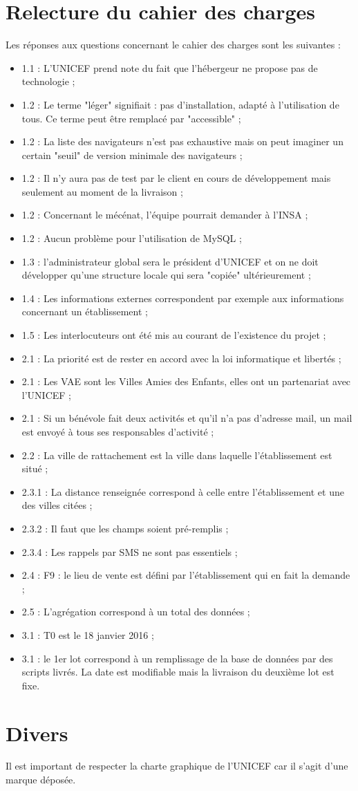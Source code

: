 \documentclass [a4paper] {article}
\begin{document}
\section{Relecture du cahier des charges}
Les réponses aux questions concernant le cahier des charges sont les suivantes : 
\begin{itemize}
\item 1.1 : L'UNICEF prend note du fait que l'hébergeur ne propose pas de technologie ;
\item 1.2 : Le terme "léger" signifiait : pas d'installation, adapté à l'utilisation de tous. Ce terme peut être remplacé par "accessible" ;
\item 1.2 : La liste des navigateurs n'est pas exhaustive mais on peut imaginer un certain "seuil" de version minimale des navigateurs ;
\item 1.2 : Il n'y aura pas de test par le client en cours de développement mais seulement au moment de la livraison ;
\item 1.2 : Concernant le mécénat, l'équipe pourrait demander à l'INSA ;
\item 1.2 : Aucun problème pour l'utilisation de MySQL ;
\item 1.3 : l'administrateur global sera le président d'UNICEF et on ne doit développer qu'une structure locale qui sera "copiée" ultérieurement ;
\item 1.4 : Les informations externes correspondent par exemple aux informations concernant un établissement ;
\item 1.5 : Les interlocuteurs ont été mis au courant de l'existence du projet ;
\item 2.1 : La priorité est de rester en accord avec la loi informatique et libertés ;
\item 2.1 : Les VAE sont les Villes Amies des Enfants, elles ont un partenariat avec l'UNICEF ;
\item 2.1 : Si un bénévole fait deux activités et qu'il n'a pas d'adresse mail, un mail est envoyé à tous ses responsables d'activité ;
\item 2.2 : La ville de rattachement est la ville dans laquelle l’établissement est situé ;
\item 2.3.1 : La distance renseignée correspond à celle entre l'établissement et une des villes citées ;
\item 2.3.2 : Il faut que les champs soient pré-remplis ;
\item 2.3.4 : Les rappels par SMS ne sont pas essentiels ;
\item 2.4 : F9 : le lieu de vente est défini par l'établissement qui en fait la demande ;
\item 2.5 : L’agrégation correspond à un total des données ;
\item 3.1 : T0 est le 18 janvier 2016 ;
\item 3.1 : le 1er lot correspond à un remplissage de la base de données par des scripts livrés. La date est modifiable mais la livraison du deuxième lot est fixe.
\end{itemize}


\section{Divers}
Il est important de respecter la charte graphique de l'UNICEF car il s'agit d'une marque déposée.


\newpage
\end{document}

